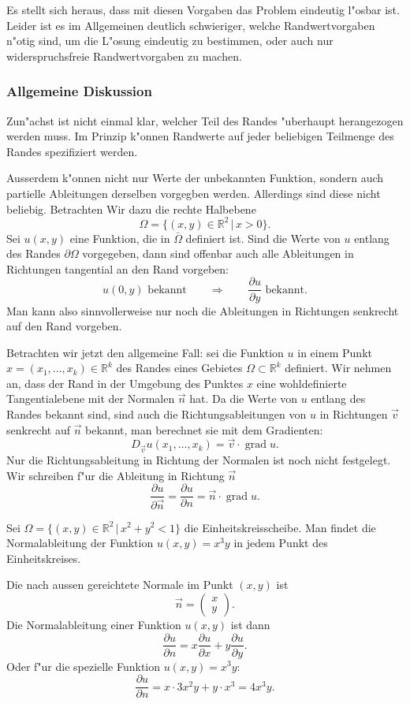 Es stellt sich heraus, dass mit diesen Vorgaben das Problem eindeutig
l"osbar ist.
Leider ist es im Allgemeinen deutlich schwieriger, welche Randwertvorgaben
n"otig sind, um die L"osung eindeutig zu bestimmen, oder auch nur
widerspruchsfreie Randwertvorgaben zu machen.

\subsubsection{Allgemeine Diskussion}
Zun"achst ist nicht einmal klar, welcher Teil des Randes
"uberhaupt herangezogen werden muss. Im Prinzip k"onnen Randwerte
auf jeder beliebigen Teilmenge des Randes spezifiziert werden.

Ausserdem k"onnen nicht nur Werte der unbekannten Funktion, sondern auch
partielle Ableitungen derselben vorgegben werden. Allerdings sind 
diese nicht beliebig. Betrachten Wir dazu die rechte Halbebene
\[
\Omega=\{(x,y)\in\mathbb R^2\,|\,x>0\}.
\]
Sei $u(x,y)$ eine Funktion, die in $\bar\Omega$ definiert ist.
Sind die Werte von $u$ entlang des Randes $\partial\Omega$ vorgegeben,
dann sind offenbar auch alle Ableitungen in Richtungen tangential
an den Rand vorgeben:
\[
\text{
$u(0,y)$ bekannt
}\qquad\Rightarrow\qquad
\text{$\frac{\partial u}{\partial y}$ bekannt.}
\]
Man kann also sinnvollerweise nur noch die Ableitungen
in Richtungen senkrecht auf den Rand vorgeben.

Betrachten wir jetzt den allgemeine Fall: sei die Funktion $u$
in einem Punkt $x=(x_1,\dots,x_k)\in\mathbb R^k$ des Randes
eines Gebietes $\Omega\subset\mathbb R^k$ definiert.
Wir nehmen an, dass der Rand in der Umgebung des Punktes $x$
eine wohldefinierte Tangentialebene mit der Normalen $\vec n$ hat.
Da die Werte von $u$ entlang des Randes bekannt sind, sind 
auch die Richtungsableitungen von $u$ in Richtungen $\vec v$
senkrecht auf $\vec n$ bekannt, man berechnet sie mit dem
Gradienten:
\[
D_{\vec v}u(x_1,\dots,x_k)=\vec v\cdot\operatorname{grad}u.
\]
Nur die Richtungsableitung in Richtung der Normalen 
ist noch nicht festgelegt.
Wir schreiben f"ur die Ableitung in Richtung $\vec n$
\[
\frac{\partial u}{\partial\vec n}=\frac{\partial u}{\partial n}
=\vec n\cdot\operatorname{grad}u.
\]

\begin{beispiel}
Sei $\Omega=\{(x,y)\in\mathbb R^2\,|\,x^2+y^2<1\}$ die Einheitskreisscheibe.
Man findet die Normalableitung der Funktion $u(x,y)=x^3y$ in jedem
Punkt des Einheitskreises.

Die nach aussen gereichtete Normale im Punkt $(x,y)$ ist
\[
\vec n=\begin{pmatrix}x\\y\end{pmatrix}.
\]
Die Normalableitung einer Funktion $u(x,y)$ ist dann
\[
\frac{\partial u}{\partial n}=
x\frac{\partial u}{\partial x}
+
y\frac{\partial u}{\partial y}.
\]
Oder f"ur die spezielle Funktion $u(x,y)=x^3y$:
\[
\frac{\partial u}{\partial n}
=
x\cdot 3x^2y+y\cdot x^3=
4x^3y.
\]
\end{beispiel}

